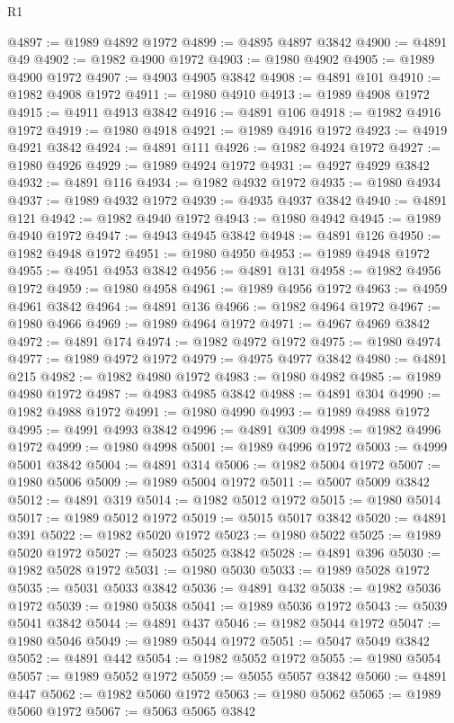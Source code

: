 \begin{lexlean}{R1}
\begin{coremodule}
@4897 := @1989 @4892 @1972
@4899 := @4895 @4897 @3842
@4900 := @4891 @49
@4902 := @1982 @4900 @1972
@4903 := @1980 @4902
@4905 := @1989 @4900 @1972
@4907 := @4903 @4905 @3842
@4908 := @4891 @101
@4910 := @1982 @4908 @1972
@4911 := @1980 @4910
@4913 := @1989 @4908 @1972
@4915 := @4911 @4913 @3842
@4916 := @4891 @106
@4918 := @1982 @4916 @1972
@4919 := @1980 @4918
@4921 := @1989 @4916 @1972
@4923 := @4919 @4921 @3842
@4924 := @4891 @111
@4926 := @1982 @4924 @1972
@4927 := @1980 @4926
@4929 := @1989 @4924 @1972
@4931 := @4927 @4929 @3842
@4932 := @4891 @116
@4934 := @1982 @4932 @1972
@4935 := @1980 @4934
@4937 := @1989 @4932 @1972
@4939 := @4935 @4937 @3842
@4940 := @4891 @121
@4942 := @1982 @4940 @1972
@4943 := @1980 @4942
@4945 := @1989 @4940 @1972
@4947 := @4943 @4945 @3842
@4948 := @4891 @126
@4950 := @1982 @4948 @1972
@4951 := @1980 @4950
@4953 := @1989 @4948 @1972
@4955 := @4951 @4953 @3842
@4956 := @4891 @131
@4958 := @1982 @4956 @1972
@4959 := @1980 @4958
@4961 := @1989 @4956 @1972
@4963 := @4959 @4961 @3842
@4964 := @4891 @136
@4966 := @1982 @4964 @1972
@4967 := @1980 @4966
@4969 := @1989 @4964 @1972
@4971 := @4967 @4969 @3842
@4972 := @4891 @174
@4974 := @1982 @4972 @1972
@4975 := @1980 @4974
@4977 := @1989 @4972 @1972
@4979 := @4975 @4977 @3842
@4980 := @4891 @215
@4982 := @1982 @4980 @1972
@4983 := @1980 @4982
@4985 := @1989 @4980 @1972
@4987 := @4983 @4985 @3842
@4988 := @4891 @304
@4990 := @1982 @4988 @1972
@4991 := @1980 @4990
@4993 := @1989 @4988 @1972
@4995 := @4991 @4993 @3842
@4996 := @4891 @309
@4998 := @1982 @4996 @1972
@4999 := @1980 @4998
@5001 := @1989 @4996 @1972
@5003 := @4999 @5001 @3842
@5004 := @4891 @314
@5006 := @1982 @5004 @1972
@5007 := @1980 @5006
@5009 := @1989 @5004 @1972
@5011 := @5007 @5009 @3842
@5012 := @4891 @319
@5014 := @1982 @5012 @1972
@5015 := @1980 @5014
@5017 := @1989 @5012 @1972
@5019 := @5015 @5017 @3842
@5020 := @4891 @391
@5022 := @1982 @5020 @1972
@5023 := @1980 @5022
@5025 := @1989 @5020 @1972
@5027 := @5023 @5025 @3842
@5028 := @4891 @396
@5030 := @1982 @5028 @1972
@5031 := @1980 @5030
@5033 := @1989 @5028 @1972
@5035 := @5031 @5033 @3842
@5036 := @4891 @432
@5038 := @1982 @5036 @1972
@5039 := @1980 @5038
@5041 := @1989 @5036 @1972
@5043 := @5039 @5041 @3842
@5044 := @4891 @437
@5046 := @1982 @5044 @1972
@5047 := @1980 @5046
@5049 := @1989 @5044 @1972
@5051 := @5047 @5049 @3842
@5052 := @4891 @442
@5054 := @1982 @5052 @1972
@5055 := @1980 @5054
@5057 := @1989 @5052 @1972
@5059 := @5055 @5057 @3842
@5060 := @4891 @447
@5062 := @1982 @5060 @1972
@5063 := @1980 @5062
@5065 := @1989 @5060 @1972
@5067 := @5063 @5065 @3842

\end{coremodule}
\end{lexlean}

